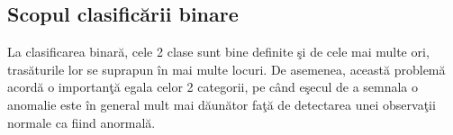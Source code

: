 \subsection{Scopul clasificării binare}

La clasificarea binară, cele 2 clase sunt bine 
definite şi de cele mai multe ori, trasăturile lor se suprapun în mai multe locuri. De 
asemenea, această problemă acordă o importanţă egala celor 2 categorii, pe când
eşecul de a semnala o anomalie este în general mult mai dăunător faţă de 
detectarea unei observaţii normale ca fiind anormală. 

